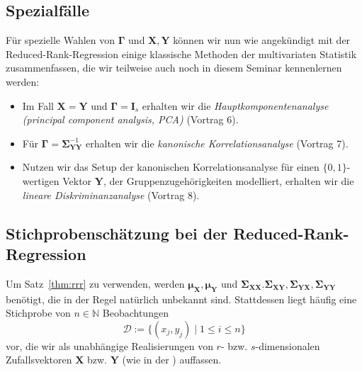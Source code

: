 \documentclass[]{article}
\newcommand{\N}{\mathbb{N}}
\newcommand{\X}{\mathbf{X}}
\newcommand{\Y}{\mathbf{Y}}
\newcommand{\muu}{\bm{\mu}}
\newcommand{\Ssigma}{\mathbf{\Sigma}}
\newcommand{\Ggamma}{\mathbf{\Gamma}}
\begin{document}
\subsection*{Spezialfälle}

Für spezielle Wahlen von $\Ggamma$ und $\X, \Y$ können wir nun wie angekündigt mit der Reduced-Rank-Regression einige klassische Methoden der multivariaten Statistik zusammenfassen, die wir teilweise auch noch in diesem Seminar kennenlernen werden:
\begin{itemize}
	\item Im Fall $\X = \Y$ und $\Ggamma = \mathbf{I}_s$ erhalten wir die \textit{Hauptkomponentenanalyse (principal component analysis, PCA)} (Vortrag 6).
	\item Für $\Ggamma = \Ssigma_{\Y\Y}^{-1}$ erhalten wir die \textit{kanonische Korrelationsanalyse} (Vortrag 7).
	\item Nutzen wir das Setup der kanonischen Korrelationsanalyse für einen $\{0, 1\}$-wertigen Vektor $\Y$, der Gruppenzugehörigkeiten modelliert, erhalten wir die \textit{lineare Diskriminanzanalyse} (Vortrag 8).
\end{itemize}

\subsection*{Stichprobenschätzung bei der Reduced-Rank-Regression}

Um Satz~\ref{thm:rrr} zu verwenden, werden $\muu_\X, \muu_\Y$ und $\Ssigma_{\X\X}. \Ssigma_{\X\Y}, \Ssigma_{\Y\X}, \Ssigma_{\Y\Y}$ benötigt, die in der Regel natürlich unbekannt sind. Stattdessen liegt häufig eine Stichprobe von $n \in \N$ Beobachtungen 
$$\mathcal{D} := \{(x_j, y_j) \;|\; 1 \leq i \leq n\}$$ 
vor, die wir als unabhängige Realisierungen von $r$- bzw. $s$-dimensionalen Zufallsvektoren $\X$ bzw. $\Y$ (wie in der ) auffassen.
\end{document}
